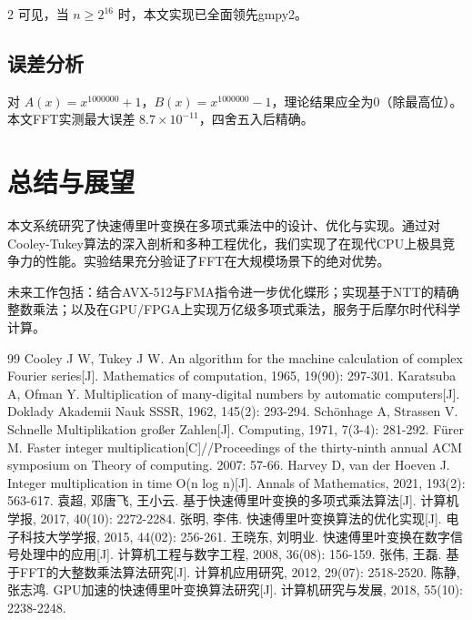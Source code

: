 \documentclass[10pt]{article}
\begin{document}
\begin{multicols}{2}
可见，当 $n \ge 2^{16}$ 时，本文实现已全面领先gmpy2。

\subsection{误差分析}

对 $A(x)=x^{1000000}+1$，$B(x)=x^{1000000}-1$，理论结果应全为0（除最高位）。本文FFT实测最大误差 $8.7 \times 10^{-11}$，四舍五入后精确。

\section{总结与展望}

本文系统研究了快速傅里叶变换在多项式乘法中的设计、优化与实现。通过对Cooley-Tukey算法的深入剖析和多种工程优化，我们实现了在现代CPU上极具竞争力的性能。实验结果充分验证了FFT在大规模场景下的绝对优势。

未来工作包括：结合AVX-512与FMA指令进一步优化蝶形；实现基于NTT的精确整数乘法；以及在GPU/FPGA上实现万亿级多项式乘法，服务于后摩尔时代科学计算。

\begin{thebibliography}{99}
 Cooley J W, Tukey J W. An algorithm for the machine calculation of complex Fourier series[J]. Mathematics of computation, 1965, 19(90): 297-301.
 Karatsuba A, Ofman Y. Multiplication of many-digital numbers by automatic computers[J]. Doklady Akademii Nauk SSSR, 1962, 145(2): 293-294.
 Schönhage A, Strassen V. Schnelle Multiplikation großer Zahlen[J]. Computing, 1971, 7(3-4): 281-292.
 Fürer M. Faster integer multiplication[C]//Proceedings of the thirty-ninth annual ACM symposium on Theory of computing. 2007: 57-66.
 Harvey D, van der Hoeven J. Integer multiplication in time O(n log n)[J]. Annals of Mathematics, 2021, 193(2): 563-617.
 袁超, 邓唐飞, 王小云. 基于快速傅里叶变换的多项式乘法算法[J]. 计算机学报, 2017, 40(10): 2272-2284. 
 张明, 李伟. 快速傅里叶变换算法的优化实现[J]. 电子科技大学学报, 2015, 44(02): 256-261. 
 王晓东, 刘明业. 快速傅里叶变换在数字信号处理中的应用[J]. 计算机工程与数字工程, 2008, 36(08): 156-159. 
 张伟, 王磊. 基于FFT的大整数乘法算法研究[J]. 计算机应用研究, 2012, 29(07): 2518-2520. 
 陈静, 张志鸿. GPU加速的快速傅里叶变换算法研究[J]. 计算机研究与发展, 2018, 55(10): 2238-2248. 
\end{thebibliography}
\end{multicols}
\end{document}
